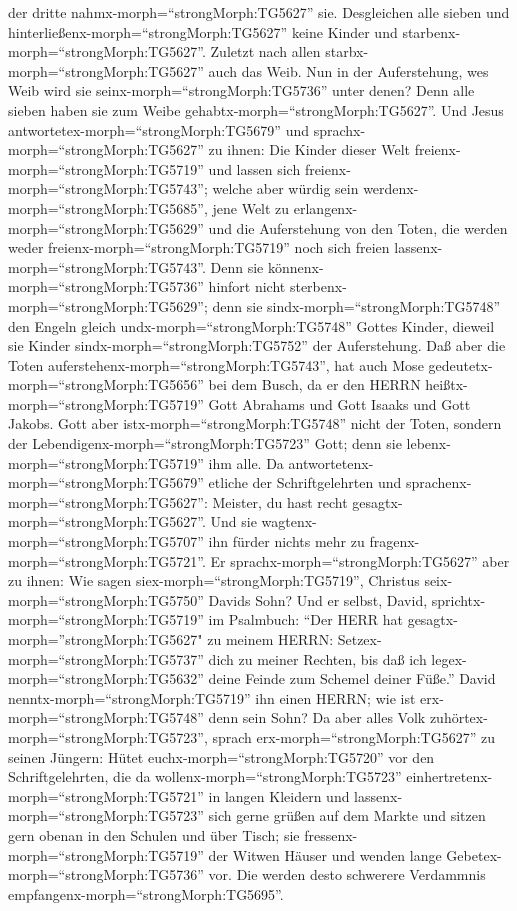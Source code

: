 der dritte nahmx-morph=``strongMorph:TG5627'' sie. Desgleichen alle
sieben und hinterließenx-morph=``strongMorph:TG5627'' keine Kinder und
starbenx-morph=``strongMorph:TG5627''.  Zuletzt nach allen
starbx-morph=``strongMorph:TG5627'' auch das Weib.  Nun in
der Auferstehung, wes Weib wird sie seinx-morph=``strongMorph:TG5736''
unter denen? Denn alle sieben haben sie zum Weibe
gehabtx-morph=``strongMorph:TG5627''.  Und Jesus
antwortetex-morph=``strongMorph:TG5679'' und
sprachx-morph=``strongMorph:TG5627'' zu ihnen: Die Kinder dieser Welt
freienx-morph=``strongMorph:TG5719'' und lassen sich
freienx-morph=``strongMorph:TG5743'';  welche aber würdig
sein werdenx-morph=``strongMorph:TG5685'', jene Welt zu
erlangenx-morph=``strongMorph:TG5629'' und die Auferstehung von den
Toten, die werden weder freienx-morph=``strongMorph:TG5719'' noch sich
freien lassenx-morph=``strongMorph:TG5743''.  Denn sie
könnenx-morph=``strongMorph:TG5736'' hinfort nicht
sterbenx-morph=``strongMorph:TG5629''; denn sie
sindx-morph=``strongMorph:TG5748'' den Engeln gleich
undx-morph=``strongMorph:TG5748'' Gottes Kinder, dieweil sie Kinder
sindx-morph=``strongMorph:TG5752'' der Auferstehung.  Daß
aber die Toten auferstehenx-morph=``strongMorph:TG5743'', hat auch Mose
gedeutetx-morph=``strongMorph:TG5656'' bei dem Busch, da er den HERRN
heißtx-morph=``strongMorph:TG5719'' Gott Abrahams und Gott Isaaks und
Gott Jakobs.  Gott aber istx-morph=``strongMorph:TG5748''
nicht der Toten, sondern der Lebendigenx-morph=``strongMorph:TG5723''
Gott; denn sie lebenx-morph=``strongMorph:TG5719'' ihm alle.
 Da antwortetenx-morph=``strongMorph:TG5679'' etliche der
Schriftgelehrten und sprachenx-morph=``strongMorph:TG5627'': Meister, du
hast recht gesagtx-morph=``strongMorph:TG5627''.  Und sie
wagtenx-morph=``strongMorph:TG5707'' ihn fürder nichts mehr zu
fragenx-morph=``strongMorph:TG5721''.  Er
sprachx-morph=``strongMorph:TG5627'' aber zu ihnen: Wie sagen
siex-morph=``strongMorph:TG5719'', Christus
seix-morph=``strongMorph:TG5750'' Davids Sohn?  Und er
selbst, David, sprichtx-morph=``strongMorph:TG5719'' im Psalmbuch: ``Der
HERR hat gesagtx-morph=''strongMorph:TG5627" zu meinem HERRN:
Setzex-morph=``strongMorph:TG5737'' dich zu meiner Rechten,
 bis daß ich legex-morph=``strongMorph:TG5632'' deine
Feinde zum Schemel deiner Füße.''  David
nenntx-morph=``strongMorph:TG5719'' ihn einen HERRN; wie ist
erx-morph=``strongMorph:TG5748'' denn sein Sohn?  Da aber
alles Volk zuhörtex-morph=``strongMorph:TG5723'', sprach
erx-morph=``strongMorph:TG5627'' zu seinen Jüngern:  Hütet
euchx-morph=``strongMorph:TG5720'' vor den Schriftgelehrten, die da
wollenx-morph=``strongMorph:TG5723''
einhertretenx-morph=``strongMorph:TG5721'' in langen Kleidern und
lassenx-morph=``strongMorph:TG5723'' sich gerne grüßen auf dem Markte
und sitzen gern obenan in den Schulen und über Tisch;  sie
fressenx-morph=``strongMorph:TG5719'' der Witwen Häuser und wenden lange
Gebetex-morph=``strongMorph:TG5736'' vor. Die werden desto schwerere
Verdammnis empfangenx-morph=``strongMorph:TG5695''.

